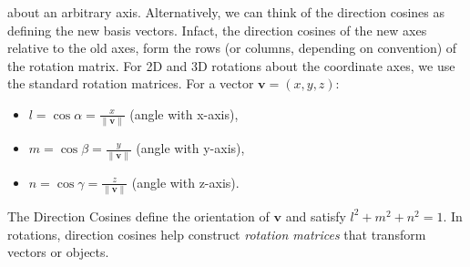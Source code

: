 \documentclass[a4paper,10pt]{article}
\begin{document}
about an arbitrary axis. Alternatively, we can think of the direction cosines as defining the new basis vectors. Infact, the direction cosines of the new axes relative to the old axes, form the rows (or columns,
depending on convention) of the rotation matrix. For 2D and 3D rotations about the coordinate axes, we use the standard rotation matrices.
For a vector \(\mathbf{v} = (x, y, z)\):
\begin{itemize}
\item \(l = \cos \alpha = \frac{x}{\|\mathbf{v}\|}\) (angle with x-axis),
\item \(m = \cos \beta = \frac{y}{\|\mathbf{v}\|}\) (angle with y-axis),
\item \(n = \cos \gamma = \frac{z}{\|\mathbf{v}\|}\) (angle with z-axis).
\end{itemize}
The Direction Cosines define the orientation of \(\mathbf{v}\) and satisfy \(l^2 + m^2 + n^2 = 1\). In
rotations, direction cosines help construct \emph{rotation matrices} that transform vectors or
objects.\\
\end{document}
